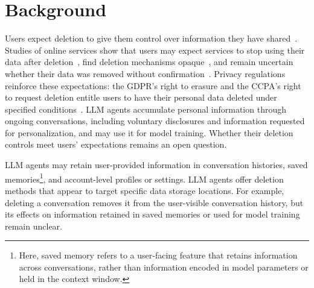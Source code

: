 \section{Background}
\label{sec:background}




%
Users expect deletion to give them control over information they have shared~\cite{murillo2018if}.
%
Studies of online services show that users may expect services to stop using their data after deletion~\cite{liu2022zombie}, find deletion mechanisms opaque~\cite{minaei2022deletion}, and remain uncertain whether their data was removed without confirmation~\cite{bumiller2026zombies}.
%
Privacy regulations reinforce these expectations: the GDPR's right to erasure and the CCPA's right to request deletion entitle users to have their personal data deleted under specified conditions~\cite{gdpr2016,ccpa2018}.
%
LLM agents accumulate personal information through ongoing conversations, including voluntary disclosures and information requested for personalization, and may use it for model training. Whether their deletion controls meet users' expectations remains an open question.


%
LLM agents may retain user-provided information in conversation histories, saved memories\footnote{Here, saved memory refers to a user-facing feature that retains information across conversations, rather than information encoded in model parameters or held in the context window.}, and account-level profiles or settings.
%
LLM agents offer deletion methods that appear to target specific data storage locations.
%
For example, deleting a conversation removes it from the user-visible conversation history, but its effects on information retained in saved memories or used for model training remain unclear.

